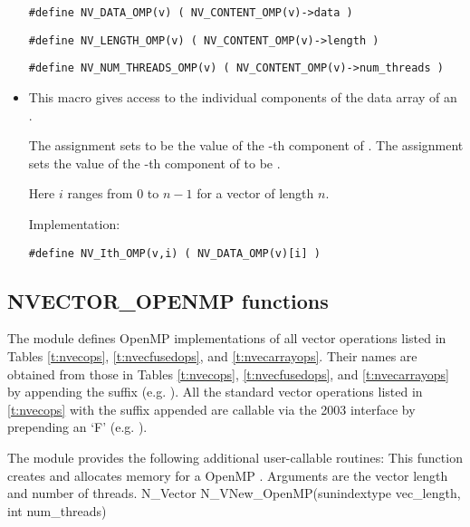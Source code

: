 \begin{itemize}
  \verb|#define NV_DATA_OMP(v) ( NV_CONTENT_OMP(v)->data )|
  
  \verb|#define NV_LENGTH_OMP(v) ( NV_CONTENT_OMP(v)->length )|

  \verb|#define NV_NUM_THREADS_OMP(v) ( NV_CONTENT_OMP(v)->num_threads )|

\item {}                                               
                                                            
  This macro gives access to the individual components of the data
  array of an .

  The assignment  sets  to be the value of 
  the -th component of . The assignment    
  sets the value of the -th component of  to be .        
  
  Here $i$ ranges from $0$ to $n-1$ for a vector of length $n$.

  Implementation:

  \verb|#define NV_Ith_OMP(v,i) ( NV_DATA_OMP(v)[i] )|

\end{itemize}


\subsection{NVECTOR\_OPENMP functions}
\label{ss:nvec_openmp_functions}

The {\nvecopenmp} module defines OpenMP implementations of all vector operations listed
in Tables \ref{t:nvecops}, \ref{t:nvecfusedops}, and \ref{t:nvecarrayops}. Their names are
obtained from those in Tables \ref{t:nvecops}, \ref{t:nvecfusedops}, and
\ref{t:nvecarrayops} by appending the suffix  (e.g. ).
All the standard vector operations listed in \ref{t:nvecops} with the suffix
 appended are callable via the {\F} 2003 interface by prepending an
`F' (e.g. ).

The module {\nvecopenmp} provides the following additional user-callable routines:
{
 This function creates and allocates memory for a OpenMP .
 Arguments are the vector length and number of threads.
}
{
 N\_Vector N\_VNew\_OpenMP(sunindextype vec\_length, int num\_threads)
}

